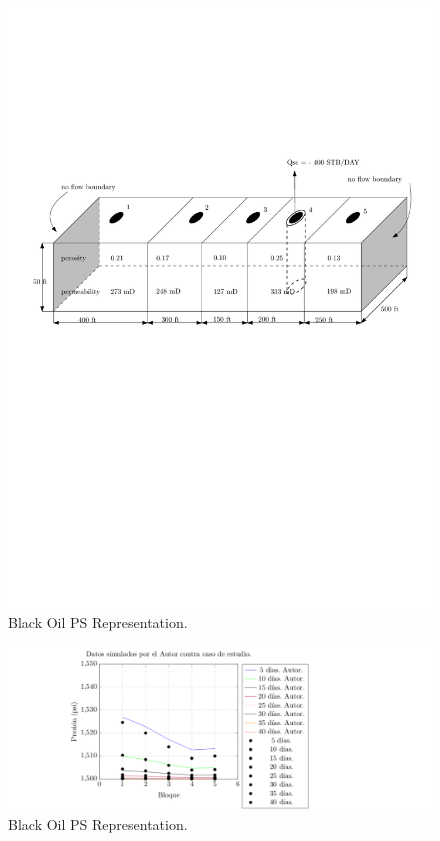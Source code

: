 \documentclass[review]{elsarticle}
\begin{document}
\begin{figure}
	\centering
	\includegraphics[width=1.0\textwidth]{Figures/casoasis.pdf}
	\caption{Black Oil PS Representation.}
	\label{fig:casoasis}
\end{figure}

\begin{figure}
	\centering
	\includegraphics[width=1.2\textwidth]{Figures/validacion.pdf}
	\caption{Black Oil PS Representation.}
	\label{fig:validacion}
\end{figure}
\end{document}
